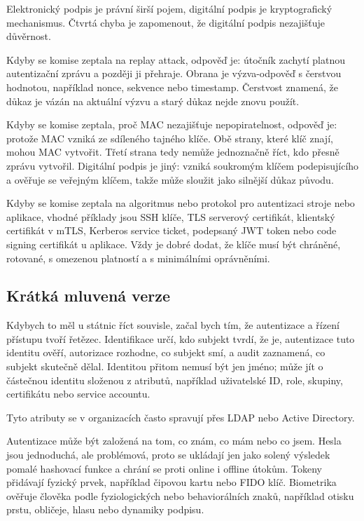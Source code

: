 \documentclass[11pt,a4paper]{article}
\begin{document}
Elektronický podpis je právní širší pojem, digitální podpis je kryptografický mechanismus. Čtvrtá chyba je zapomenout, že digitální podpis nezajišťuje důvěrnost.

Kdyby se komise zeptala na replay attack, odpověď je: útočník zachytí platnou autentizační zprávu a později ji přehraje. Obrana je výzva-odpověď s čerstvou hodnotou, například nonce, sekvence nebo timestamp. Čerstvost znamená, že důkaz je vázán na aktuální výzvu a starý důkaz nejde znovu použít.

Kdyby se komise zeptala, proč MAC nezajišťuje nepopiratelnost, odpověď je: protože MAC vzniká ze sdíleného tajného klíče. Obě strany, které klíč znají, mohou MAC vytvořit. Třetí strana tedy nemůže jednoznačně říct, kdo přesně zprávu vytvořil. Digitální podpis je jiný: vzniká soukromým klíčem podepisujícího a ověřuje se veřejným klíčem, takže může sloužit jako silnější důkaz původu.

Kdyby se komise zeptala na algoritmus nebo protokol pro autentizaci stroje nebo aplikace, vhodné příklady jsou SSH klíče, TLS serverový certifikát, klientský certifikát v mTLS, Kerberos service ticket, podepsaný JWT token nebo code signing certifikát u aplikace. Vždy je dobré dodat, že klíče musí být chráněné, rotované, s omezenou platností a s minimálními oprávněními.

\subsection*{Krátká mluvená verze}

Kdybych to měl u státnic říct souvisle, začal bych tím, že autentizace a řízení přístupu tvoří řetězec. Identifikace určí, kdo subjekt tvrdí, že je, autentizace tuto identitu ověří, autorizace rozhodne, co subjekt smí, a audit zaznamená, co subjekt skutečně dělal. Identitou přitom nemusí být jen jméno; může jít o částečnou identitu složenou z atributů, například uživatelské ID, role, skupiny, certifikátu nebo service accountu.

Tyto atributy se v organizacích často spravují přes LDAP nebo Active Directory.

Autentizace může být založená na tom, co znám, co mám nebo co jsem. Hesla jsou jednoduchá, ale problémová, proto se ukládají jen jako solený výsledek pomalé hashovací funkce a chrání se proti online i offline útokům. Tokeny přidávají fyzický prvek, například čipovou kartu nebo FIDO klíč. Biometrika ověřuje člověka podle fyziologických nebo behaviorálních znaků, například otisku prstu, obličeje, hlasu nebo dynamiky podpisu.
\end{document}
